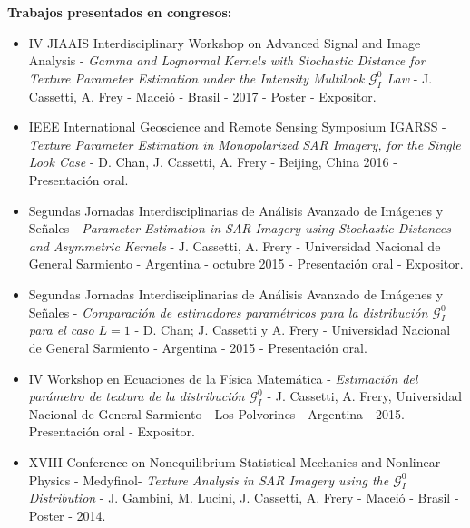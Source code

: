\textbf{Trabajos presentados en congresos:}
\begin{itemize}
	\item  	IV JIAAIS Interdisciplinary Workshop on Advanced Signal and Image Analysis -  \emph{Gamma and Lognormal Kernels with Stochastic Distance for Texture Parameter Estimation under the Intensity Multilook $\mathcal{G}_I^0$ Law} - J. Cassetti, A. Frey - Maceió  - Brasil - 2017 - Poster -  Expositor.
	\item  IEEE International Geoscience and Remote Sensing Symposium IGARSS - \emph{Texture Parameter Estimation in Monopolarized SAR Imagery, for the Single Look Case} - D. Chan, J. Cassetti, A. Frery  - Beijing, China 2016 - Presentación oral.
	\item Segundas Jornadas Interdisciplinarias de Análisis Avanzado de Imágenes y Señales  - \emph{Parameter Estimation in SAR Imagery using Stochastic Distances and Asymmetric Kernels} - J. Cassetti, A. Frery - Universidad Nacional de General Sarmiento - Argentina - octubre 2015 - Presentación oral - Expositor.
	\item Segundas Jornadas Interdisciplinarias de Análisis Avanzado de Imágenes y Señales - \emph{Comparación de estimadores paramétricos para la distribución $\mathcal{G}_I^0$ para el caso $L = 1$} -  D. Chan; J. Cassetti y A. Frery - Universidad Nacional de General Sarmiento - Argentina - 2015  - Presentación oral.
	\item IV Workshop en Ecuaciones de la Física Matemática  - \emph{Estimación del parámetro de textura de la distribución $\mathcal{G}_I^0$} - J. Cassetti, A. Frery, Universidad Nacional de General Sarmiento - Los Polvorines - Argentina - 2015. Presentación oral - Expositor.
	\item XVIII Conference on Nonequilibrium Statistical Mechanics and Nonlinear Physics - Medyfinol- \emph{Texture Analysis in SAR Imagery using the $\mathcal{G}_I^0$ Distribution}  - J. Gambini,  M. Lucini, J. Cassetti, A. Frery - Maceió  - Brasil - Poster - 2014.
\end{itemize}


%
%
\vspace{1cm}

